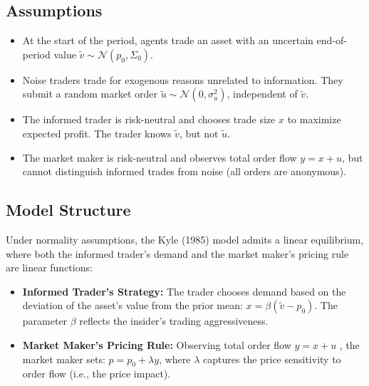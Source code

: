 \documentclass{beamer}
\begin{document}
\subsection{Assumptions}
\begin{frame}

\begin{itemize}
    \item At the start of the period, agents trade an asset with an uncertain end-of-period value \( \tilde{v} \sim \mathcal{N}(p_0, \Sigma_0) \).

    \item Noise traders trade for exogenous reasons unrelated to information. They submit a random market order \( \tilde{u} \sim \mathcal{N}(0, \sigma_u^2) \), independent of \( \tilde{v} \).

    \item The informed trader is risk-neutral and chooses trade size \( x \) to maximize expected profit. The trader knows \( \tilde{v} \), but not \( \tilde{u} \).

    \item The market maker is risk-neutral and observes total order flow \( y = x + u \), but cannot distinguish informed trades from noise (all orders are anonymous).

\end{itemize}
\end{frame}

\subsection{Model Structure}
\begin{frame}

Under normality assumptions, the Kyle (1985) model admits a linear equilibrium, where both the informed trader’s demand and the market maker’s pricing rule are linear functions:

\begin{itemize}
    \item \textbf{Informed Trader’s Strategy:}  
    The trader chooses demand based on the deviation of the asset’s value from the prior mean:  
    \( x = \beta(\tilde{v} - p_0) \).  
    The parameter \( \beta \) reflects the insider’s trading aggressiveness.

    \item \textbf{Market Maker’s Pricing Rule:}  
    Observing total order flow \( y = x + u \) , the market maker sets:  \( p = p_0 + \lambda y \), where \( \lambda \) captures the price sensitivity to order flow (i.e., the price impact).
    
\end{itemize}

\end{frame}
\end{document}

